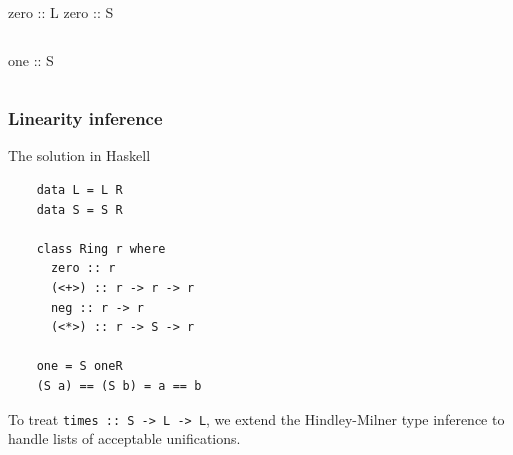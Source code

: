 \documentclass[10pt]{beamer}
\begin{document}
\begin{frame}[fragile]
  \begin{columns}
    \begin{column}{0.5\textwidth}
  \begin{semiverbatim}
    zero :: L
    zero :: S
  \end{semiverbatim}
    \end{column}
    \begin{column}{0.5\textwidth}
    \end{column}
  \end{columns}

  \begin{columns}
    \begin{column}{0.5\textwidth}
  \begin{semiverbatim}
    one :: S
  \end{semiverbatim}
    \end{column}
    \begin{column}{0.5\textwidth}
    \end{column}
  \end{columns}
\end{frame}  


\begin{frame}[fragile]
  \frametitle{Linearity inference}
  
  \begin{center}
    The solution in Haskell
  \end{center}

  \begin{lstlisting}
    data L = L R
    data S = S R
    
    class Ring r where
      zero :: r
      (<+>) :: r -> r -> r
      neg :: r -> r
      (<*>) :: r -> S -> r

    one = S oneR
    (S a) == (S b) = a == b
  \end{lstlisting}

  \begin{center}
    To treat \alert{\lstinline{times :: S -> L -> L}}, we extend the
    Hindley-Milner type inference to handle lists of acceptable
    unifications.
  \end{center}
\end{frame}

\end{document}
